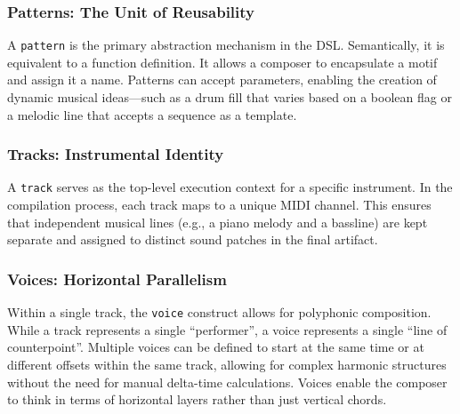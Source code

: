 \subsubsection{Patterns: The Unit of Reusability}
A \texttt{pattern} is the primary abstraction mechanism in the DSL\@.
Semantically, it is equivalent to a function definition.
It allows a composer to encapsulate a motif and assign it a name.
Patterns can accept parameters, enabling the creation of dynamic musical ideas—such as a drum fill that varies based on
a boolean flag or a melodic line that accepts a sequence as a template.

\subsubsection{Tracks: Instrumental Identity}
A \texttt{track} serves as the top-level execution context for a specific instrument.
In the compilation process, each track maps to a unique MIDI channel.
This ensures that independent musical lines (e.g., a piano melody and a bassline) are kept separate and assigned to
distinct sound patches in the final artifact.

\subsubsection{Voices: Horizontal Parallelism}
Within a single track, the \texttt{voice} construct allows for polyphonic composition.
While a track represents a single ``performer'', a voice represents a single ``line of counterpoint''.
Multiple voices can be defined to start at the same time or at different offsets within the same track, allowing for
complex harmonic structures without the need for manual delta-time calculations.
Voices enable the composer to think in terms of horizontal layers rather than just vertical chords.
